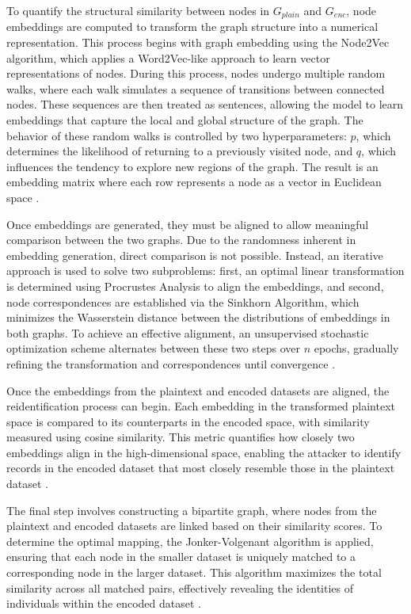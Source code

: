 To quantify the structural similarity between nodes in \(G_{plain}\) and \(G_{enc}\), node embeddings are computed to transform the graph structure into a numerical representation.
This process begins with graph embedding using the Node2Vec algorithm, which applies a Word2Vec-like approach to learn vector representations of nodes.
During this process, nodes undergo multiple random walks, where each walk simulates a sequence of transitions between connected nodes.
These sequences are then treated as sentences, allowing the model to learn embeddings that capture the local and global structure of the graph.
The behavior of these random walks is controlled by two hyperparameters: \(p\), which determines the likelihood of returning to a previously visited node, and \(q\), which influences the tendency to explore new regions of the graph.
The result is an embedding matrix where each row represents a node as a vector in Euclidean space \cite{schaefer2024}.

Once embeddings are generated, they must be aligned to allow meaningful comparison between the two graphs.
Due to the randomness inherent in embedding generation, direct comparison is not possible.
Instead, an iterative approach is used to solve two subproblems: first, an optimal linear transformation is determined using Procrustes Analysis to align the embeddings, and second, node correspondences are established via the Sinkhorn Algorithm, which minimizes the Wasserstein distance between the distributions of embeddings in both graphs.
To achieve an effective alignment, an unsupervised stochastic optimization scheme alternates between these two steps over \(n\) epochs, gradually refining the transformation and correspondences until convergence \cite{schaefer2024}.

Once the embeddings from the plaintext and encoded datasets are aligned, the reidentification process can begin.
Each embedding in the transformed plaintext space is compared to its counterparts in the encoded space, with similarity measured using cosine similarity.
This metric quantifies how closely two embeddings align in the high-dimensional space, enabling the attacker to identify records in the encoded dataset that most closely resemble those in the plaintext dataset \cite{schaefer2024}.

The final step involves constructing a bipartite graph, where nodes from the plaintext and encoded datasets are linked based on their similarity scores.
To determine the optimal mapping, the Jonker-Volgenant algorithm is applied, ensuring that each node in the smaller dataset is uniquely matched to a corresponding node in the larger dataset.
This algorithm maximizes the total similarity across all matched pairs, effectively revealing the identities of individuals within the encoded dataset \cite{schaefer2024}.

